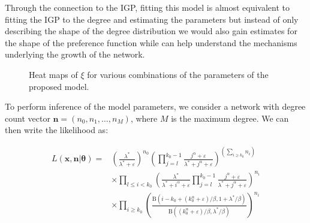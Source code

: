 \documentclass[
  sn-basic,
]{sn-jnl}
\theoremstyle{plain}
\theoremstyle{plain}
\theoremstyle{remark}
\begin{document}
Through the connection to the IGP, fitting this model is almost
equivalent to fitting the IGP to the degree and estimating the
parameters but instead of only describing the shape of the degree
distribution we would also gain estimates for the shape of the
preference function while can help understand the mechanisms underlying
the growth of the network.

\begin{figure}


\caption{\label{fig-polyheat}Heat maps of \(\xi\) for various
combinations of the parameters of the proposed model.}

\end{figure}%

\newpage

To perform inference of the model parameters, we consider a network with
degree count vector \(\pmb n = (n_0, n_1, \ldots, n_M)\), where \(M\) is
the maximum degree. We can then write the likelihood as:

\begin{align*}
L(\pmb x,\pmb n | \pmb \theta) = &\left(\frac{\lambda^*}{\lambda^*+\varepsilon}\right)^{n_0}\left(\prod_{j=l}^{k_0-1}\frac{j^\alpha +\varepsilon}{\lambda^* + j^\alpha +\varepsilon}\right)^{\left(\sum_{i\ge k_0}n_{i}\right)} \\ &\times \prod_{l \le i<k_0}\left(\frac{\lambda^*}{\lambda^* +i^\alpha + \varepsilon } \prod_{j=l}^{k_0-1}\frac{j^\alpha + \varepsilon}{\lambda^* + j^\alpha + \varepsilon}\right)^{n_i}\\ &\times \prod_{i\ge k_0}\left(\frac{\text{B}(i-k_0 + (k_0^\alpha + \varepsilon)/\beta,1+\lambda^*/\beta)}{\text{B}((k_0^\alpha + \varepsilon)/\beta,\lambda^*/\beta)}\right)^{n_i}
\end{align*}\label{eq-lh}
\end{document}
